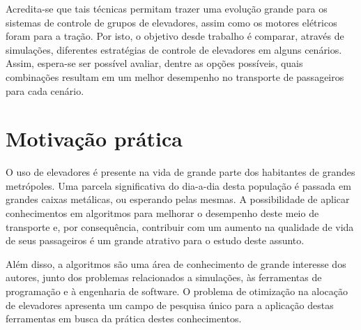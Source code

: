 Acredita-se que tais técnicas permitam trazer uma evolução grande para os
sistemas de controle de grupos de elevadores, assim como os motores elétricos
foram para a tração. Por isto, o objetivo desde trabalho é comparar, através de
simulações, diferentes estratégias de controle de elevadores em alguns cenários.
Assim, espera-se ser possível avaliar, dentre as opções possíveis, quais
combinações resultam em um melhor desempenho no transporte de passageiros para
cada cenário.

\section{\label{section:motivation}Motivação prática}

O uso de elevadores é presente na vida de grande parte dos habitantes de grandes
metrópoles. Uma parcela significativa do dia-a-dia desta população é passada em
grandes caixas metálicas, ou esperando pelas mesmas. A possibilidade de aplicar
conhecimentos em algoritmos para melhorar o desempenho deste meio de transporte
e, por consequência, contribuir com um aumento na qualidade de vida de seus
passageiros é um grande atrativo para o estudo deste assunto.

Além disso, a algoritmos são uma área de conhecimento de grande interesse dos
autores, junto dos problemas relacionados a simulações, às ferramentas de
programação e à engenharia de software. O problema de otimização na alocação de
elevadores apresenta um campo de pesquisa único para a aplicação destas
ferramentas em busca da prática destes conhecimentos.

